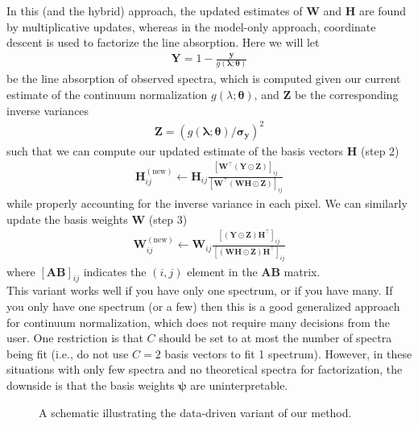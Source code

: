 \documentclass[modern]{aastex631}
\renewcommand{\vec}[1]{\mathbf{#1}}
\newcommand{\vectheta}{\boldsymbol{\theta}}
\newcommand{\vecpsi}{\boldsymbol{\psi}}
\newcommand{\vecW}{\mathbf{W}}
\newcommand{\vecH}{\mathbf{H}}
\newcommand{\hadamard}{\odot}
\newcommand{\transpose}{^\top}
\begin{document}
In this (and the hybrid) approach, the updated estimates of $\vecW$ and $\vecH$ are found by multiplicative updates, whereas in the model-only approach, coordinate descent is used to factorize the line absorption. Here we will let 
\begin{align}
    \vec{Y} = 1 - \frac{\vec{y}}{g(\vec{\lambda};\vectheta)}
\end{align}
\noindent{}be the line absorption of observed spectra, which is computed given our current estimate of the continuum normalization $g(\lambda; \vectheta)$, and $\vec{Z}$ be the corresponding inverse variances
\begin{align}
    \vec{Z} = \left(g(\vec{\lambda};\vectheta)/\vec{\sigma_{y}}\right)^2 
\end{align}
such that we can compute our updated estimate of the basis vectors $\vecH$ (step 2) 
\begin{align}
    \vecH_{ij}^{\mathrm{(new)}} \leftarrow \vecH_{ij} \frac{\left[\vecW\transpose\left(\vec{Y} \hadamard \vec{Z}\right)\right]_{ij}}{\left[\vecW\transpose\left(\vecW\vecH \hadamard \vec{Z}\right)\right]_{ij}} 
\end{align}
\noindent{}while properly accounting for the inverse variance in each pixel. We can similarly update the basis weights $\vecW$ (step 3)
\begin{align}
    \vecW_{ij}^{\mathrm{(new)}} \leftarrow \vecW_{ij} \frac{\left[\left(\vec{Y} \hadamard \vec{Z}\right)\vecH\transpose\right]_{ij}}{\left[\left(\vecW\vecH\hadamard\vec{Z}\right)\vecH\transpose\right]_{ij}}
\end{align}
\noindent{}where $\left[\vec{AB}\right]_{ij}$ indicates the $(i,j)$ element in the $\vec{AB}$ matrix.\\

This variant works well if you have only one spectrum, or if you have many. If you only have one spectrum (or a few) then this is a good generalized approach for continuum normalization, which does not require many decisions from the user. One restriction is that $C$ should be set to at most the number of spectra being fit (i.e., do not use $C = 2$ basis vectors to fit 1 spectrum). However, in these situations with only few spectra and no theoretical spectra for factorization, the downside is that the basis weights $\vecpsi$ are uninterpretable.

\begin{figure*}
    \caption{A schematic illustrating the data-driven variant of our method.\label{fig:schematic-data-driven}}
\end{figure*}
\end{document}
